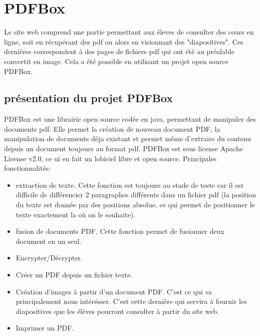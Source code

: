 \chapter{PDFBox}
	Le site web comprend une partie permettant aux éleves de consulter des cours en ligne, soit en récupérant des pdf ou alors en visionnant des "diapositives". Ces dernières correspondent à des pages de fichiers pdf qui ont été au préalable convertit en image. 
	Cela a été possible en utilisant un projet open source PDFBox.
	
	\section{présentation du projet PDFBox}
	PDFBox est une librairie open source codée en java, permettant de manipuler des documents pdf. Elle permet la création de nouveau document PDF, la manipulation de documents déja existant et permet même d'extraire du contenu depuis un document toujours au format pdf.
	\newline
	PDFBox est sous license Apache License v2.0, ce ui en fait un lobiciel libre et open source.
	\newline \newline
	Principales fonctionnalités:
	\begin{itemize}
		\item 	extraction de texte.
			Cette fonction est toujours au stade de teste car il est difficile de différencier 2 paragraphes différents dans un fichier pdf (la position du texte est donnée par des positions absolue, ce qui permet de positionner le texte exactement la où on le souhaite).  
			\newline  \newline
		\item  fusion de documents PDF. 
			\newline  \newline
			Cette fonction permet de fusionner deux document en un seul.
		\item 	Encrypter/Décrypter.
			 \newline  \newline
		\item 	Créer un PDF depuis un fichier texte.
			 \newline  \newline
		\item 	Création d'images à partir d'un document PDF.
			C'est ce qui va principalement nous intérésser. C'est cette dernière qui servira à fournir les diapositives que les élèves pourront consulter à partir du site web.
			 \newline  \newline
		\item 	Imprimer un PDF.
	\end{itemize}

